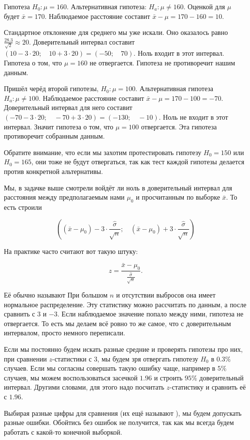 \documentclass[12pt, a4paper, oneside]{article}
\begin{document}
\begin{sol}
Гипотеза $H_0:  \mu = 160.$  Альтернативная гипотеза: $H_a: \mu \ne 160$. Оценкой для $\mu$ будет $\bar x = 170$.  Наблюдаемое расстояние составит $\bar x - \mu = 170 - 160 = 10$. 

Стандартное отклонение для среднего мы уже искали. Оно оказалось равно $\frac{28.3}{\sqrt{2}} \approx 20$. Доверительный интервал составит $(10 - 3 \cdot 20; \quad  10 + 3 \cdot 20) = (-50; \quad  70)$.  Ноль входит в этот интервал. Гипотеза о том, что $\mu = 160$ не отвергается. Гипотеза не противоречит нашим данным.

Пришёл черёд второй гипотезы, $H_0: \mu = 100.$ Альтернативная гипотеза $H_a: \mu \ne 100$. Наблюдаемое расстояние составит $\bar x - \mu = 170 - 100 = -70$.  Доверительный интервал для него составит $(-70 - 3 \cdot 20; \quad -70 + 3 \cdot 20) = (-130; \quad -10)$. Ноль не входит в этот интервал. Значит гипотеза о том, что $\mu = 100$ отвергается. Эта гипотеза противоречит собранным данным.

Обратите внимание, что если мы захотим протестировать гипотезу $H_0 = 150$ или $H_0 = 165$, они тоже не будут отвергаться, так как тест каждой гипотезы делается против конкретной альтернативы. 

Мы, в задачке выше смотрели войдёт ли ноль в доверительный интервал для расстояния между предполагаемым нами $\mu_0$ и просчитанным по выборке $\bar x$. То есть строили 

\[ 
\left(( \bar x - \mu_0) - 3 \cdot \frac{\hat \sigma}{\sqrt{n}}; \quad ( \bar x - \mu_0) + 3 \cdot \frac{\hat \sigma}{\sqrt{n}} \right)
\] 

На практике часто считают вот такую штуку: 

$$
z = \frac{\bar x - \mu_0}{\frac{\hat \sigma}{\sqrt{n}}}.
$$

Её обычно называют  При большом $n$ и отсутствии выбросов она имеет нормальное распределение.  Эту статистику можно рассчитать по данным, а после сравнить с $3$ и $-3$. Если наблюдаемое значение попало между ними, гипотеза не отвергается. То есть мы делаем всё ровно то же самое, что с доверительным интервалом, просто немного переписали. 

Если мы постоянно будем искать разные средние и проверять гипотезы про них, при сравнении $z$-статистики с $3$, мы будем зря отвергать гипотезу $H_0$ в $0.3\%$ случаев. Если мы согласны совершать такую ошибку чаще, например в $5\%$ случаев, мы можем воспользоваться засечкой $1.96$ и строить $95\%$ доверительный интервал. Другими словами, для этого надо посчитать $z$-статистику и сравнить её с $1.96$. 

Выбирая разные цифры для сравнения (их ещё называют ), мы будем допускать разные ошибки. Обойтись без ошибок не получится, так как мы всегда будем работать с какой-то конечной выборкой.
\end{sol}
\end{document}
